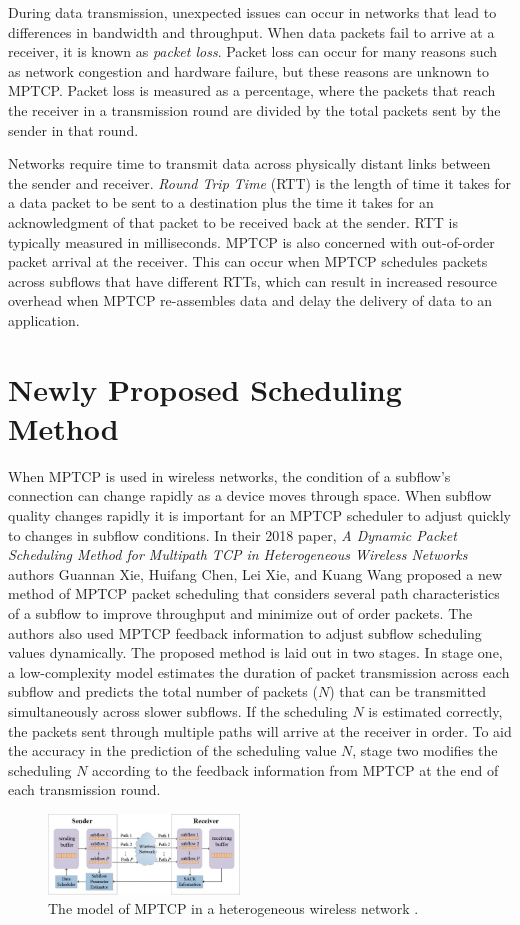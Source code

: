\documentclass[sigplan,screen,nonacm]{acmart}
\begin{document}
During data transmission, unexpected issues can occur in networks that lead to differences in bandwidth and throughput. When data packets fail to arrive at a receiver, it is known as \emph{packet loss}. Packet loss can occur for many reasons such as network congestion and hardware failure, but these reasons are unknown to MPTCP. Packet loss is measured as a percentage, where the packets that reach the receiver in a transmission round are divided by the total packets sent by the sender in that round. 

Networks require time to transmit data across physically distant links between the sender and receiver. \emph{Round Trip Time} (RTT) is the length of time it takes for a data packet to be sent to a destination plus the time it takes for an acknowledgment of that packet to be received back at the sender. RTT is typically measured in milliseconds. MPTCP is also concerned with out-of-order packet arrival at the receiver. This can occur when MPTCP schedules packets across subflows that have different RTTs, which can result in increased resource overhead when MPTCP re-assembles data and delay the delivery of data to an application. \cite{Performance:2019}

\section{Newly Proposed Scheduling Method}
\label{sec:method}
When MPTCP is used in wireless networks, the condition of a subflow's connection can change rapidly as a device moves through space. When subflow quality changes rapidly it is important for an MPTCP scheduler to adjust quickly to changes in subflow conditions. In their 2018 paper, \emph{A Dynamic Packet Scheduling Method for Multipath TCP in Heterogeneous Wireless Networks} \cite{NewMethod:2018} authors Guannan Xie, Huifang Chen, Lei Xie, and Kuang Wang proposed a new method of MPTCP packet scheduling that considers several path characteristics of a subflow to improve throughput and minimize out of order packets. The authors also used MPTCP feedback information to adjust subflow scheduling values dynamically. The proposed method is laid out in two stages. In stage one, a low-complexity model estimates the duration of packet transmission across each subflow and predicts the total number of packets ($N$) that can be transmitted simultaneously across slower subflows. If the scheduling $N$ is estimated correctly, the packets sent through multiple paths will arrive at the receiver in order. To aid the accuracy in the prediction of the scheduling value $N$, stage two modifies the scheduling $N$ according to the feedback information from MPTCP at the end of each transmission round.
\begin{figure}
\includegraphics[width=2in]{mptcp_paper/assets/method-model.jpg}
\caption{The model of MPTCP in a heterogeneous wireless network \cite{NewMethod:2018}.}
\label{fig:method-model}
\end{figure}
\end{document}
